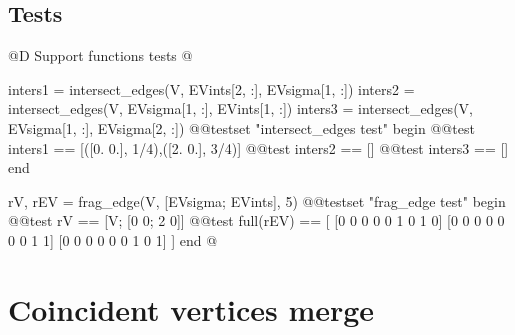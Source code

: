 \documentclass[10pt,oneside]{article}
\begin{document}
\subsection{Tests}
@D Support functions tests
@{inters1 = intersect_edges(V, EVints[2, :], EVsigma[1, :])
inters2 = intersect_edges(V, EVsigma[1, :], EVints[1, :])
inters3 = intersect_edges(V, EVsigma[1, :], EVsigma[2, :])
@@testset "intersect_edges test" begin
    @@test inters1 == [([0. 0.], 1/4),([2. 0.], 3/4)]
    @@test inters2 == []
    @@test inters3 == []
end

rV, rEV = frag_edge(V, [EVsigma; EVints], 5)
@@testset "frag_edge test" begin
    @@test rV == [V; [0 0; 2 0]]
    @@test full(rEV) == [
        [0 0 0 0 0 1 0 1 0]
        [0 0 0 0 0 0 0 1 1]
        [0 0 0 0 0 0 1 0 1]
    ]
end
@}






\section{Coincident vertices merge}
\end{document}

